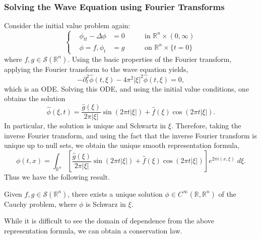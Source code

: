 \documentclass{article}
\numberwithin{equation}{section}
\begin{document}
	\subsubsection{Solving the Wave Equation using Fourier Transforms}
	Consider the initial value problem again: 
	\begin{equation*}
		\left\{
		\begin{alignedat}{3}
			&\phi_{tt} - \Delta \phi &= 0 &\qquad \text{in $\mathbb{R}^{n} \times (0,\infty)$}\\
			&\phi =f, \phi_{t} &= g &\qquad \text{on $\mathbb{R}^{n} \times \{t = 0\}$}
		\end{alignedat}
		\right. 
	\end{equation*}
	where $f, g \in \mathcal{S}(\mathbb{R}^{n})$. Using the basic properties of the Fourier transform, applying the Fourier transform to the wave equation yields, 
	\begin{equation*}
		-\partial_{t}^{2}\hat{\phi}(t,\xi) -4\pi^{2}|\xi|^{2}\hat{\phi}(t,\xi) = 0, 
	\end{equation*}
	which is an ODE. Solving this ODE, and using the initial value conditions, one obtains the solution 
	\begin{equation*}
		\hat{\phi}(\xi, t) = \frac{\hat{g}(\xi)}{2\pi |\xi|}\sin(2\pi t|\xi|) + \hat{f}(\xi)\cos(2\pi t |\xi|). 
	\end{equation*}
	In particular, the solution is unique and Schwartz in $\xi$. Therefore, taking the inverse Fourier transform, and using the fact that the inverse Fourier transform is unique up to null sets, we obtain the unique smooth representation formula, 
	\begin{equation}
		\boxed{\phi(t, x) =\int_{\mathbb{R}^{n}}\left[\frac{\hat{g}(\xi)}{2\pi |\xi|}\sin(2\pi t|\xi|) + \hat{f}(\xi)\cos(2\pi t |\xi|)\right]e^{2\pi i (x, \xi)}\;d\xi}. 
	\end{equation}
	Thus we have the following result. 
	\begin{theorem}
		Given $f, g \in \mathcal{S}(\mathbb{R}^{n})$, there exists a unique solution $\phi \in C^{\infty}(\mathbb{R}, \mathbb{R}^{n})$ of the Cauchy problem, where $\phi$ is Schwarz in $\xi$. 
	\end{theorem}
	
	
	While it is difficult to see the domain of dependence from the above representation formula, we can obtain a conservation law. 
	
\end{document}
